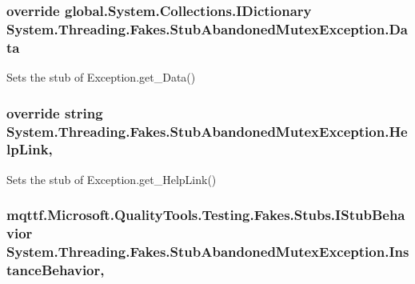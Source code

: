 \hypertarget{class_system_1_1_threading_1_1_fakes_1_1_stub_abandoned_mutex_exception_aedaac65246a074608b708cc11360c5bb}{
\subsubsection[{Data}]{\setlength{\rightskip}{0pt plus 5cm}override global.\-System.\-Collections.\-I\-Dictionary System.\-Threading.\-Fakes.\-Stub\-Abandoned\-Mutex\-Exception.\-Data\hspace{0.3cm}{\ttfamily [get]}}}\label{class_system_1_1_threading_1_1_fakes_1_1_stub_abandoned_mutex_exception_aedaac65246a074608b708cc11360c5bb}


Sets the stub of Exception.\-get\-\_\-\-Data()

\hypertarget{class_system_1_1_threading_1_1_fakes_1_1_stub_abandoned_mutex_exception_a9d981a636be4f4ca89a76b1176671735}{
\subsubsection[{Help\-Link}]{\setlength{\rightskip}{0pt plus 5cm}override string System.\-Threading.\-Fakes.\-Stub\-Abandoned\-Mutex\-Exception.\-Help\-Link\hspace{0.3cm}{\ttfamily [get]}, {\ttfamily [set]}}}\label{class_system_1_1_threading_1_1_fakes_1_1_stub_abandoned_mutex_exception_a9d981a636be4f4ca89a76b1176671735}


Sets the stub of Exception.\-get\-\_\-\-Help\-Link()

\hypertarget{class_system_1_1_threading_1_1_fakes_1_1_stub_abandoned_mutex_exception_a659c6205c2d6737f9588ecab285753a8}{
\subsubsection[{Instance\-Behavior}]{\setlength{\rightskip}{0pt plus 5cm}mqttf.\-Microsoft.\-Quality\-Tools.\-Testing.\-Fakes.\-Stubs.\-I\-Stub\-Behavior System.\-Threading.\-Fakes.\-Stub\-Abandoned\-Mutex\-Exception.\-Instance\-Behavior\hspace{0.3cm}{\ttfamily [get]}, {\ttfamily [set]}}}\label{class_system_1_1_threading_1_1_fakes_1_1_stub_abandoned_mutex_exception_a659c6205c2d6737f9588ecab285753a8}


